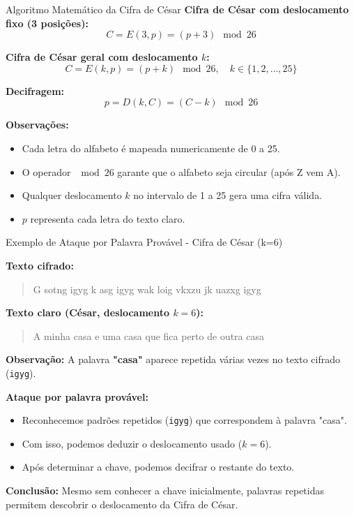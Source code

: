 \begin{frame}{Algoritmo Matemático da Cifra de César}
    \textbf{Cifra de César com deslocamento fixo (3 posições):}
    \[
        C = E(3, p) = (p + 3) \mod 26
    \]

    \textbf{Cifra de César geral com deslocamento \(k\):}
    \[
        C = E(k, p) = (p + k) \mod 26, \quad k \in \{1, 2, \dots, 25\}
    \]

    \textbf{Decifragem:}
    \[
        p = D(k, C) = (C - k) \mod 26
    \]

    \medskip
    \textbf{Observações:}
    \begin{itemize}
        \item Cada letra do alfabeto é mapeada numericamente de 0 a 25.
        \item O operador \(\mod 26\) garante que o alfabeto seja circular (após Z vem A).
        \item Qualquer deslocamento \(k\) no intervalo de 1 a 25 gera uma cifra válida.
        \item \(p\) representa cada letra do texto claro.
    \end{itemize}
\end{frame}

\begin{frame}{Exemplo de Ataque por Palavra Provável - Cifra de César (k=6)}

    \textbf{Texto cifrado:}
    \begin{quote}
        G sotng igyg k asg igyg wak loig vkxzu jk uazxg igyg
    \end{quote}

    \textbf{Texto claro  (César, deslocamento $k=6$):}
    \begin{quote}
        A minha casa e uma casa que fica perto de outra casa
    \end{quote}



    \medskip
    \textbf{Observação:}
    A palavra \textbf{"casa"} aparece repetida várias vezes no texto cifrado (\texttt{igyg}).

    \medskip
    \textbf{Ataque por palavra provável:}
    \begin{itemize}
        \item Reconhecemos padrões repetidos (\texttt{igyg}) que correspondem à palavra "casa".
        \item Com isso, podemos deduzir o deslocamento usado ($k=6$).
        \item Após determinar a chave, podemos decifrar o restante do texto.
    \end{itemize}

    \textbf{Conclusão:}
    Mesmo sem conhecer a chave inicialmente, palavras repetidas permitem descobrir o deslocamento da Cifra de César.
\end{frame}

